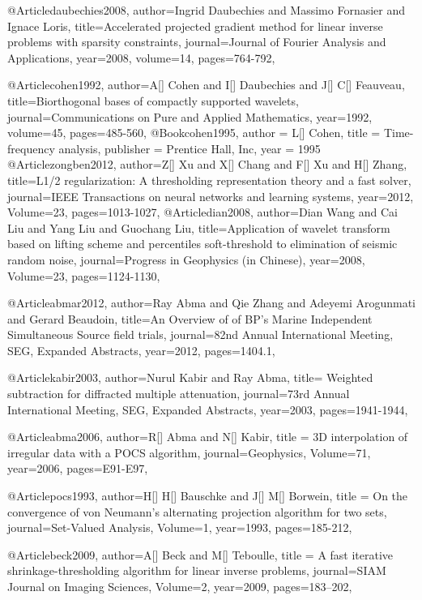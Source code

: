 @Article{daubechies2008,
  author={Ingrid Daubechies and Massimo Fornasier and Ignace Loris},
  title={Accelerated projected gradient method for linear inverse problems with sparsity constraints},
  journal={Journal of Fourier Analysis and Applications},
  year=2008,
  volume=14,
  pages={764-792},
}

@Article{cohen1992,
  author={A[] Cohen and I[] Daubechies and J[] C[] Feauveau},
  title={Biorthogonal bases of compactly supported wavelets},
  journal={Communications on Pure and Applied Mathematics},
  year=1992,
  volume=45,
  pages={485-560},
}
@Book{cohen1995,
  author = 	 {L[] Cohen},
  title = 	 { Time-frequency analysis},
  publisher = 	 {Prentice Hall, Inc},
  year = 	 1995}
@Article{zongben2012,
  author={Z[] Xu and X[] Chang and F[] Xu and H[] Zhang},
  title={{L}1/2 regularization: A thresholding representation theory and a fast solver},
  journal={IEEE Transactions on neural networks and learning systems},
  year=2012,
  Volume=23,
  pages={1013-1027},
}
@Article{dian2008,
  author={Dian Wang and Cai Liu and Yang Liu and Guochang Liu},
  title={Application of wavelet transform based on lifting scheme and percentiles soft-threshold to elimination of seismic random noise},
  journal={Progress in Geophysics (in Chinese)},
  year=2008,
  Volume=23,
  pages={1124-1130},
}


@Article{abmar2012,
  author={Ray Abma and Qie Zhang and Adeyemi Arogunmati and Gerard Beaudoin},
  title={An Overview of of {BP}'s Marine Independent Simultaneous Source field trials},
  journal={82nd Annual International Meeting, SEG, Expanded Abstracts},
  year=2012,
  pages={1404.1},
}

@Article{kabir2003,
  author={Nurul Kabir and Ray Abma},
  title={	Weighted subtraction for diffracted multiple attenuation},
  journal={73rd Annual International Meeting, SEG, Expanded Abstracts},
  year=2003,
  pages={1941-1944},
}

@Article{abma2006,
  author={R[] Abma and N[] Kabir},
  title = {3{D} interpolation of irregular data with a {POCS} algorithm},
  journal={Geophysics},
  Volume=71,
  year=2006,
  pages={E91-E97},
}

@Article{pocs1993,
  author={H[] H[] Bauschke and J[] M[] Borwein},
  title = {On the convergence of von Neumann's alternating projection algorithm for two sets},
  journal={Set-Valued Analysis},
  Volume=1,
  year=1993,
  pages={185-212},
}


@Article{beck2009,
  author={A[] Beck and M[] Teboulle},
  title = {A fast iterative shrinkage-thresholding algorithm for
linear inverse problems},
  journal={SIAM Journal on Imaging Sciences},
  Volume=2,
  year=2009,
  pages={183–202},
}

